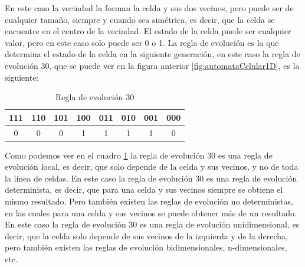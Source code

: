     \vskip 0.5cm
    En este caso la vecindad la forman la celda y sus dos vecinos, pero puede ser de cualquier tama\~no, siempre y cuando
        sea sim\'etrica, es decir, que la celda se encuentre en el centro de la vecindad. El estado de la celda puede ser
        cualquier valor, pero en este caso solo puede ser 0 o 1. La regla de evoluci\'on es la que determina el estado de
        la celda en la siguiente generaci\'on, en este caso la regla de evoluci\'on 30, que se puede ver en la figura anterior
        \ref{fig:automataCelular1D}, es la siguiente:
        \begin{table}[h!]
            \centering
            \begin{tabular}{|c|c|c|c|c|c|c|c|}
                \hline
                \textbf{111} & \textbf{110} & \textbf{101} & \textbf{100} & \textbf{011} & \textbf{010} & \textbf{001} & \textbf{000} \\
                \hline
                0 & 0 & 0 & 1 & 1 & 1 & 1 & 0 \\
                \hline
            \end{tabular}
            \caption{Regla de evoluci\'on 30}
            \label{tab:reglaEvolucion30}
        \end{table}
    \vskip 0.5cm
    Como podemos ver en el cuadro \ref{tab:reglaEvolucion30} la regla de evoluci\'on 30 es una regla de evoluci\'on local, 
        es decir, que solo depende de la celda y sus vecinos, y no de toda la l\'inea de celdas. En este caso la regla de evoluci\'on
        30 es una regla de evoluci\'on determinista, es decir, que para una celda y sus vecinos siempre se obtiene el mismo resultado.
        Pero tambi\'en existen las reglas de evoluci\'on no deterministas, en las cuales para una celda y sus vecinos se puede obtener
        m\'as de un resultado. En este caso la regla de evoluci\'on 30 es una regla de evoluci\'on unidimensional, es decir, que la
        celda solo depende de sus vecinos de la izquierda y de la derecha, pero tambi\'en existen las reglas de evoluci\'on
        bidimensionales, n-dimensionales, etc.
    \vskip 0.5cm
